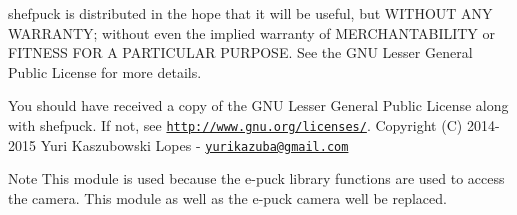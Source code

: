 shefpuck is distributed in the hope that it will be useful, but W\+I\+T\+H\+O\+U\+T A\+N\+Y W\+A\+R\+R\+A\+N\+T\+Y; without even the implied warranty of M\+E\+R\+C\+H\+A\+N\+T\+A\+B\+I\+L\+I\+T\+Y or F\+I\+T\+N\+E\+S\+S F\+O\+R A P\+A\+R\+T\+I\+C\+U\+L\+A\+R P\+U\+R\+P\+O\+S\+E. See the G\+N\+U Lesser General Public License for more details.

You should have received a copy of the G\+N\+U Lesser General Public License along with shefpuck. If not, see \href{http://www.gnu.org/licenses/}{\tt http\+://www.\+gnu.\+org/licenses/}. Copyright (C) 2014-\/2015 Yuri Kaszubowski Lopes -\/ \href{mailto:yurikazuba@gmail.com}{\tt yurikazuba@gmail.\+com}

\begin{DoxyNote}{Note}
This module is used because the e-\/puck library functions are used to access the camera. This module as well as the e-\/puck camera well be replaced. 
\end{DoxyNote}

